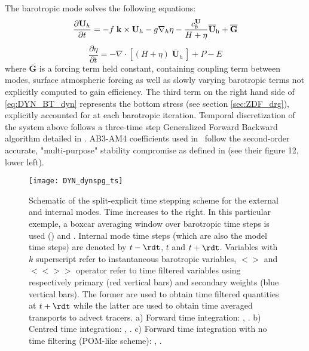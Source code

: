 \documentclass[../main/NEMO_manual]{subfiles}
\begin{document}
The barotropic mode solves the following equations:
\begin{equation}
  \label{eq:DYN_BT_dyn}
  \frac{\partial {\mathrm \overline{{\mathbf U}}_h} }{\partial t}=
  -f\;{\mathrm {\mathbf k}}\times {\mathrm \overline{{\mathbf U}}_h}
  -g\nabla _h \eta -\frac{c_b^{\textbf U}}{H+\eta} \mathrm {\overline{{\mathbf U}}_h} + \mathrm {\overline{\mathbf G}}
\end{equation}
\[
  \frac{\partial \eta }{\partial t}=-\nabla \cdot \left[ {\left( {H+\eta } \right) \; {\mathrm{\mathbf \overline{U}}}_h \,} \right]+P-E
\]
where $\mathrm {\overline{\mathbf G}}$ is a forcing term held constant, containing coupling term between modes,
surface atmospheric forcing as well as slowly varying barotropic terms not explicitly computed to gain efficiency.
The third term on the right hand side of \autoref{eq:DYN_BT_dyn} represents the bottom stress
(see section \autoref{sec:ZDF_drg}), explicitly accounted for at each barotropic iteration.
Temporal discretization of the system above follows a three-time step Generalized Forward Backward algorithm
detailed in \citet{shchepetkin.mcwilliams_OM05}.
AB3-AM4 coefficients used in \NEMO\ follow the second-order accurate,
"multi-purpose" stability compromise as defined in \citet{shchepetkin.mcwilliams_ibk09}
(see their figure 12, lower left).

\begin{figure}[!t]
  \centering
  \texttt{[image: DYN\_dynspg\_ts]}
  \caption[Split-explicit time stepping scheme for the external and internal modes]{
    Schematic of the split-explicit time stepping scheme for the external and internal modes.
    Time increases to the right.
    In this particular exemple,
    a boxcar averaging window over  barotropic time steps is used
    () and .
    Internal mode time steps (which are also the model time steps) are denoted by
    $t-\rdt$, $t$ and $t+\rdt$.
    Variables with $k$ superscript refer to instantaneous barotropic variables,
    $< >$ and $<< >>$ operator refer to time filtered variables using respectively primary
    (red vertical bars) and secondary weights (blue vertical bars).
    The former are used to obtain time filtered quantities at $t+\rdt$ while
    the latter are used to obtain time averaged transports to advect tracers.
    a) Forward time integration:
    \protect{},  \protect{}.
    b) Centred time integration:
    \protect{}, \protect{}.
    c) Forward time integration with no time filtering (POM-like scheme):
    \protect{},  \protect{}.}
  \label{fig:DYN_spg_ts}
\end{figure}
\end{document}

